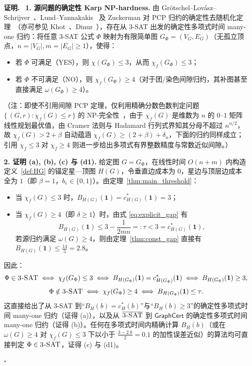 \documentclass[11pt,a4paper]{ctexart}
\theoremstyle{definition}
\newenvironment{proofcn}{\par\noindent\textbf{证明.}\ }{\hfill$\square$\par}
\newcommand{\GraphCert}{\mathsf{GraphCert}}
\newcommand{\1}{\boldsymbol 1}
\newcommand{\0}{\boldsymbol 0}
\newcommand{\chif}{\chi_f}
\begin{document}
\begin{proofcn}
\textbf{1. 源问题的确定性 Karp NP-hardness.}
由 Gr\"otschel--Lov\'asz--Schrijver~\cite{GLS1981,GLS1988}、Lund--Yannakakis~\cite{LundYannakakis1994} 及 Zuckerman 对 PCP 归约的确定性去随机化定理~\cite{Zuckerman2007}（亦可参见 Khot~\cite{Khot2001}、Dinur~\cite{Dinur2007}），存在从 \textsc{3-SAT} 出发的确定性多项式时间 many-one 归约：将任意 \textsc{3-SAT} 公式 $\Phi$ 映射为有限简单图 $G_\Phi=(V_G,E_G)$（无孤立顶点，$n=|V_G|,m=|E_G|\ge 1$），使得：
\begin{itemize}
\item 若 $\Phi$ 可满足（YES），则 $\chi(G_\Phi)\le 3$，从而 $\chif(G_\Phi)\le 3$；
\item 若 $\Phi$ 不可满足（NO），则 $\chif(G_\Phi)\ge 4$（对于团/染色间隙归约，其补图甚至直接满足 $\omega(G_\Phi)\ge 4$）。
\end{itemize}
（注：即使不引用间隙 PCP 定理，仅利用精确分数色数判定问题 $\{\,(G,r):\chif(G)\le r\,\}$ 的 NP-完全性~\cite{GLS1981}，由于 $\chif(G)$ 是维数为 $n$ 的 $0$--$1$ 矩阵线性规划最优值，由 Cramer 法则与 Hadamard 行列式界知其分母不超过 $n^{n/2}$，故 $\chif(G)>2+\beta$ 自动蕴涵 $\chif(G)\ge (2+\beta)+\delta_n$，下面的归约同样成立；引用 $\chif\le 3$ 对 $\chif\ge 4$ 则进一步给出多项式有界整数精度与常数近似间隙。）

\medskip
\noindent\textbf{2. 证明 (a), (b), (c) 与 (d1).}
给定图 $G=G_\Phi$，在线性时间 $O(n+m)$ 内构造定义~\ref{def:HG} 的锚定星—顶图 $H(G)$，令垂直边成本为 $0$，星边与顶层边成本全为 $1$（即 $\beta=1$，$b_e\in\{0,1\}$）。由定理~\ref{thm:main_threshold}：
\begin{itemize}
\item 当 $\chif(G)\le 3$ 时，$B_{H(G)}(\1)=c_{H(G)}^*(\1)=3$；
\item 当 $\chif(G)\ge 4$（即 $\delta\ge 1$）时，由式 \eqref{eq:explicit_gap} 有
\[
 B_{H(G)}(\1) \le 3 - \frac{1}{2mn} =: \tau < 3 = c_{H(G)}^*(\1),
\]
若源归约满足 $\omega(G)\ge 4$，则由定理~\ref{thm:const_gap} 直接有 $B_{H(G)}(\1)\le \frac{14}{5}=2.8$。
\end{itemize}
因此：
\[
 \Phi\in\textsc{3-SAT} \iff \chif(G_\Phi)\le 3 \iff B_{H(G_\Phi)}(\1)=c_{H(G_\Phi)}^*(\1) \iff B_{H(G_\Phi)}(\1)\ge 3,
\]
\[
 \Phi\notin\textsc{3-SAT} \iff \chif(G_\Phi)\ge 4 \iff B_{H(G_\Phi)}(\1)\le \tau.
\]
这直接给出了从 \textsc{3-SAT} 到“$B_H(b)=c_H^*(b)$”与“$B_H(b)\ge 3$”的确定性多项式时间 many-one 归约（证得 (a)），以及从 $\overline{\textsc{3-SAT}}$ 到 $\GraphCert$ 的确定性多项式时间 many-one 归约（证得 (b)）。任何在多项式时间内精确计算 $B_H(b)$（或在 $\omega(G)\ge 4$ 对 $\chif(G)\le 3$ 下以小于 $\frac{3-2.8}{2}=0.1$ 的加性误差近似）的算法均可直接判定 $\Phi\in\textsc{3-SAT}$，证得 (c) 与 (d1)。


\end{proofcn}
\end{document}

